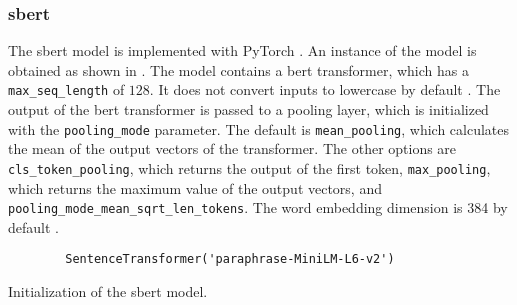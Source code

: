\subsubsection*{\ac{sbert}}\label{subsubsec:impl-sbert}

The \ac{sbert} model is implemented with PyTorch \cite{HfsentTrans2019}.
An instance of the model is obtained as shown in .
The model contains a \ac{bert} transformer, which has a \texttt{max\_seq\_length} of $128$. 
It does not convert inputs to lowercase by default \cite{sbert-dev}.
The output of the \ac{bert} transformer is passed to a pooling layer, which is initialized with the \texttt{pooling\_mode} parameter.
The default is \texttt{mean\_pooling}, which calculates the mean of the output vectors of the transformer.
The other options are \texttt{cls\_token\_pooling}, which returns the output of the first token, 
\texttt{max\_pooling}, which returns the maximum value of the output vectors,
and \texttt{pooling\_mode\_mean\_sqrt\_len\_tokens}.
The word embedding dimension is 384 by default \cite{sbert-dev}.

\begin{listing}[htp]
    \begin{verbatim}
        SentenceTransformer('paraphrase-MiniLM-L6-v2')
    \end{verbatim}
    \caption[Initialization of the \ac{sbert} model]{Initialization of the \ac{sbert} model.
    }
    \label{lst:impl-sbert}
\end{listing}
